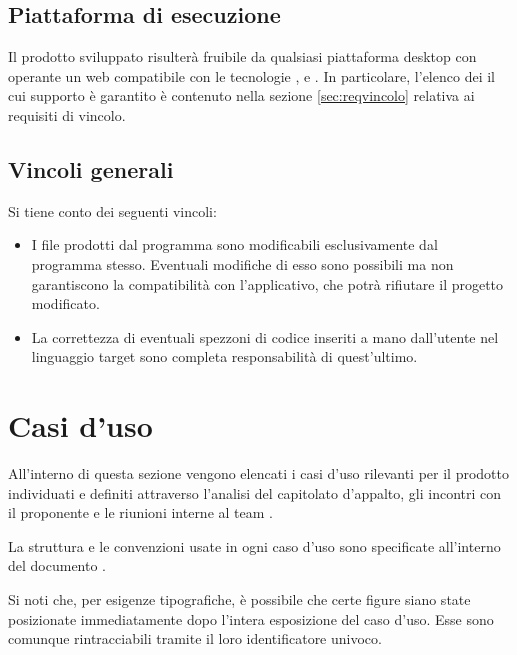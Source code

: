 \subsection{Piattaforma di esecuzione}
Il prodotto sviluppato risulterà fruibile da qualsiasi piattaforma desktop con operante un  web compatibile con le tecnologie ,  e . In particolare, l'elenco dei  il cui supporto è garantito è contenuto nella sezione \ref{sec:reqvincolo} relativa ai requisiti di vincolo.

\subsection{Vincoli generali}
Si tiene conto dei seguenti vincoli:
\begin{itemize}
	\item I file prodotti dal programma sono modificabili esclusivamente dal programma stesso. Eventuali modifiche di esso sono possibili ma non garantiscono la compatibilità con l'applicativo, che potrà rifiutare il progetto modificato.
	\item La correttezza di eventuali spezzoni di codice inseriti a mano dall'utente nel linguaggio target sono completa responsabilità di quest'ultimo.
\end{itemize}






\section{Casi d'uso}
All'interno di questa sezione vengono elencati i casi d'uso rilevanti per il prodotto \proj{} individuati e definiti attraverso l'analisi del capitolato d'appalto, gli incontri con il proponente e le riunioni interne al team \hx{}.

La struttura e le convenzioni usate in ogni caso d'uso sono specificate all'interno del documento \NdP.

Si noti che, per esigenze tipografiche, è possibile che certe figure siano state posizionate immediatamente dopo l'intera esposizione del caso d'uso. Esse sono comunque rintracciabili tramite il loro identificatore univoco.

